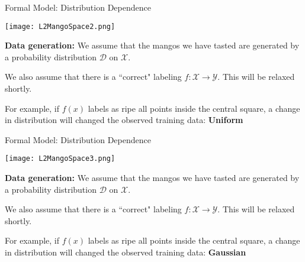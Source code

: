 \documentclass[10pt, table, handout]{beamer}
\begin{document}
\begin{frame}[fragile]{Formal Model: Distribution Dependence}
  \begin{minipage}[t][0.5\textheight][t]{\textwidth}
    \texttt{[image: L2MangoSpace2.png]}
        \centering
  \end{minipage}
  \vfill
  \begin{minipage}[t][0.5\textheight][t]{\textwidth}
\textbf{Data generation:} We assume that the mangos we have tasted are generated by a probability distribution $\mathcal{D}$ on $\mathcal{X}$. \pause

We also assume that there is a ``correct" labeling $f:\mathcal{X}\to\mathcal{Y}$. This will be relaxed shortly.\pause

For example, if $f(x)$ labels as ripe all points inside the central square, a change in distribution will changed the observed training data: \textbf{Uniform}
  \end{minipage}

\end{frame}




\begin{frame}[fragile]{Formal Model: Distribution Dependence}
  \begin{minipage}[t][0.5\textheight][t]{\textwidth}
    \texttt{[image: L2MangoSpace3.png]}
        \centering
  \end{minipage}
  \vfill
  \begin{minipage}[t][0.5\textheight][t]{\textwidth}
\textbf{Data generation:} We assume that the mangos we have tasted are generated by a probability distribution $\mathcal{D}$ on $\mathcal{X}$. 

We also assume that there is a ``correct" labeling $f:\mathcal{X}\to\mathcal{Y}$. This will be relaxed shortly.

For example, if $f(x)$ labels as ripe all points inside the central square, a change in distribution will changed the observed training data: \textbf{Gaussian}
  \end{minipage}

\end{frame}
\end{document}
